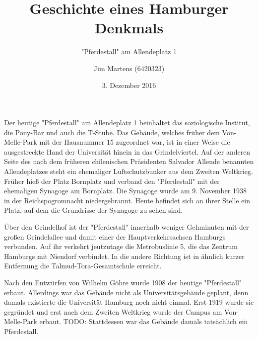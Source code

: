 \documentclass[10pt,a4paper,oneside,ngerman,numbers=noenddot]{scrartcl}
\begin{document}
\author{Jim Martens (6420323)}
\title{Geschichte eines Hamburger Denkmals}
\subtitle{"Pferdestall" am Allendeplatz 1}
\date{3. Dezember 2016}
\maketitle

Der heutige "Pferdestall" am Allendeplatz 1 beinhaltet das soziologische Institut,
die Pony-Bar und auch die T-Stube. Das Gebäude, welches früher dem Von-Melle-Park
mit der Hausnummer 15 zugeordnet war, ist in einer Weise die ausgestreckte Hand
der Universität hinein in das Grindelviertel. Auf der anderen Seite des nach dem
früheren chilenischen Präsidenten Salvador Allende benannten Allendeplatzes steht
ein ehemaliger Luftschutzbunker aus dem Zweiten Weltkrieg. Früher hieß der Platz
Bornplatz und verband den "Pferdestall" mit der ehemaligen Synagoge am Bornplatz.
Die Synagoge wurde am 9. November 1938 in der Reichspogromnacht niedergebrannt.
Heute befindet sich an ihrer Stelle ein Platz, auf dem die Grundrisse der Synagoge
zu sehen sind.

Über den Grindelhof ist der "Pferdestall" innerhalb weniger Gehminuten mit der
großen Grindelallee und damit einer der Hauptverkehrsachsen Hamburgs verbunden.
Auf ihr verkehrt jeutzutage die Metrobuslinie 5, die das Zentrum Hamburgs mit
Niendorf verbindet.
In die andere Richtung ist in ähnlich kurzer Entfernung die Talmud-Tora-Gesamtschule
erreicht.

Nach den Entwürfen von Wilhelm Göhre wurde 1908 der heutige "Pferdestall" erbaut.
Allerdings war das Gebäude nicht als Universitätsgebäude geplant, denn damals
existierte die Universität Hamburg noch nicht einmal. Erst 1919 wurde sie gegründet
und erst nach dem Zweiten Weltkrieg wurde der Campus am Von-Melle-Park erbaut.
TODO:
Stattdessen war das Gebäude damals tatsächlich ein Pferdestall.
\end{document}
